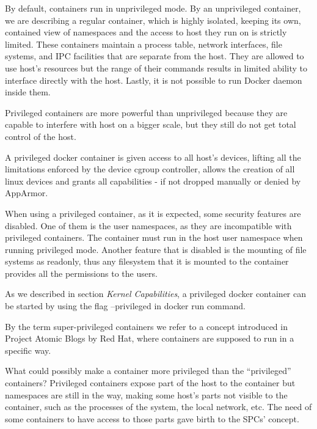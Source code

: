 \begin{description}[style=nextline]
\item[Unprivileged containers]
By default, containers run in unprivileged mode. By an unprivileged container, we are describing a regular container, which is highly isolated, keeping its own, contained view of namespaces and the access to host they run on is strictly limited. These containers maintain a process table, network interfaces, file systems, and IPC facilities that are separate from the host. They are allowed to use host's resources
but the range of their commands results in limited ability to interface directly with the host. Lastly, it is not possible to run Docker daemon inside them. \cite{redhatspc}

\item[Privileged containers]
Privileged containers are more powerful than unprivileged because they are capable to interfere with host on a bigger scale, but they still do not get total control of the host.

A privileged docker container is given access to all host's devices, lifting all the limitations enforced by the device cgroup controller, allows the creation of all linux devices and grants all capabilities - if not dropped manually or denied by AppArmor.

When using a privileged container, as it is expected, some security features are disabled. One of them is the user namespaces, as they are incompatible with privileged containers. The container must run in the host user namespace when running privileged mode. Another feature that is disabled is the mounting of file systems as readonly, thus any filesystem that it is mounted to the container provides all the permissions to the users.

As we described in section \textit{Kernel Capabilities}, a privileged docker container can be started by using the flag --privileged in docker run command.

\item[Super-Privileged Containers]
By the term super-privileged containers we refer to a concept introduced in Project Atomic Blogs by Red Hat, where containers are supposed to run in a specific way. \cite{troubledocker}

What could possibly make a container more privileged than the “privileged” containers? Privileged containers expose part of the host to the container but namespaces are still in the way, making some host's parts not visible to the container, such as the processes of the system, the local network, etc. The need of some containers to have access to those parts gave birth to the SPCs' concept.


\end{description}
